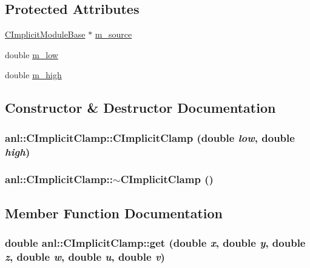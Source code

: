 \subsection*{Protected Attributes}
\begin{DoxyCompactItemize}
\item 
\hyperlink{classanl_1_1CImplicitModuleBase}{CImplicitModuleBase} $\ast$ \hyperlink{classanl_1_1CImplicitClamp_a633534f6ca40ae2dfb627d2ed8e08fd5}{m\_\-source}
\item 
double \hyperlink{classanl_1_1CImplicitClamp_a18025dbdf7677d1eba58921441ce9829}{m\_\-low}
\item 
double \hyperlink{classanl_1_1CImplicitClamp_a2c3bcf1591133ba5e413ec31b613f6ce}{m\_\-high}
\end{DoxyCompactItemize}


\subsection{Constructor \& Destructor Documentation}
\hypertarget{classanl_1_1CImplicitClamp_a83b99652f3faeea45d780e3364dae813}{
\subsubsection[{CImplicitClamp}]{\setlength{\rightskip}{0pt plus 5cm}anl::CImplicitClamp::CImplicitClamp (double {\em low}, \/  double {\em high})}}
\label{classanl_1_1CImplicitClamp_a83b99652f3faeea45d780e3364dae813}
\hypertarget{classanl_1_1CImplicitClamp_ac10aba65ac1866aacb3270999f32ca75}{
\subsubsection[{$\sim$CImplicitClamp}]{\setlength{\rightskip}{0pt plus 5cm}anl::CImplicitClamp::$\sim$CImplicitClamp ()}}
\label{classanl_1_1CImplicitClamp_ac10aba65ac1866aacb3270999f32ca75}


\subsection{Member Function Documentation}
\hypertarget{classanl_1_1CImplicitClamp_aaa9e4cef1586ec11c49dff2c6563aeea}{
\subsubsection[{get}]{\setlength{\rightskip}{0pt plus 5cm}double anl::CImplicitClamp::get (double {\em x}, \/  double {\em y}, \/  double {\em z}, \/  double {\em w}, \/  double {\em u}, \/  double {\em v})}}
\label{classanl_1_1CImplicitClamp_aaa9e4cef1586ec11c49dff2c6563aeea}


